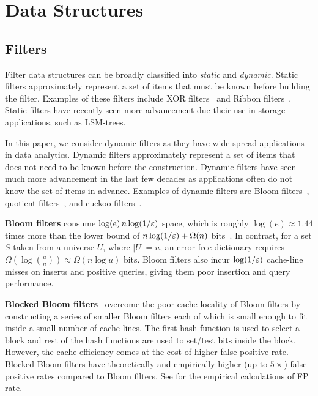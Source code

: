 \section{Data Structures}

\subsection{Filters}\label{sec:prelim}

Filter data structures can be broadly classified into \emph{static} and
\emph{dynamic}.  Static filters approximately represent a set of items that must
be known before building the filter. Examples of these filters include XOR
filters~\cite{GrafLe20} and Ribbon filters~\cite{DillingerWalzer21}. Static
filters have recently seen more advancement due their use in storage
applications, such as LSM-trees.


In this paper, we consider dynamic filters as they have wide-spread applications
in data analytics.  Dynamic filters approximately represent a set of items that
does not need to be known before the construction. Dynamic filters have seen
much more advancement in the last few decades as applications often do not know
the set of items in advance. Examples of dynamic filters are Bloom
filters~\cite{Bloom70}, quotient filters~\cite{BenderFaJo12,
PandeyBJP17b,DillingerMa09,PaghPaRa05,EinzigerFr16}, and cuckoo
filters~\cite{FanAnKa14,BreslowJ18}.

\textbf{Bloom filters} consume $\log(e)\, n\log (1/\varepsilon)$ space, which is roughly
$\log(e)\approx 1.44$ times more than the lower bound of $n\log (1/\varepsilon) + \Omega(n)$
bits~\cite{CarterFG78}. In contrast, for a set $S$ taken from a universe $U$,
where $|U|=u$, an error-free dictionary requires $\Omega(\log {u\choose n})
\approx \Omega(n \log u)$ bits. Bloom filters also incur $\log (1/\varepsilon)$ cache-line
misses on inserts and positive queries, giving them poor insertion and query
performance.

\textbf{Blocked Bloom filters}~\cite{putze2007cache} overcome the poor cache
locality of Bloom filters by constructing a series of smaller Bloom filters each
of which is small enough to fit inside a small number of cache lines. The first
hash function is used to select a block and rest of the hash functions are used
to set/test bits inside the block. However, the cache efficiency comes at the
cost of higher false-positive rate. Blocked Bloom filters have theoretically and
empirically higher (up to $5\times$) false positive rates compared to Bloom
filters. See  for the empirical calculations of FP
rate.

